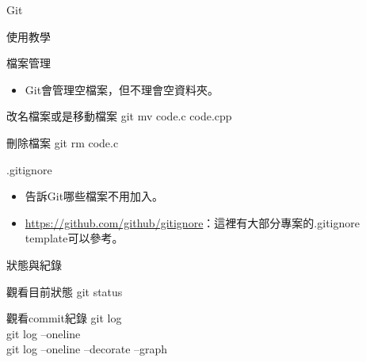 \documentclass[pdf,16pt]{beamer}
\begin{document}
\begin{section}{Git}
\begin{subsection}{使用教學}
      \begin{frame}{檔案管理}
        \begin{itemize}
          \item Git會管理空檔案，但不理會空資料夾。
        \end{itemize}
        \begin{block}{改名檔案或是移動檔案}
          git mv code.c code.cpp
        \end{block}
        \begin{block}{刪除檔案}
          git rm code.c
        \end{block}
      \end{frame}
      
      \begin{frame}{.gitignore}
        \begin{itemize}
          \item 告訴Git哪些檔案不用加入。
          \item \url{https://github.com/github/gitignore}：這裡有大部分專案的.gitignore template可以參考。
        \end{itemize}
      \end{frame}
      
      \begin{frame}{狀態與紀錄}
        \begin{block}{觀看目前狀態}
          git status
        \end{block}
        \begin{block}{觀看commit紀錄}
          git log\\
          git log --oneline\\
          git log --oneline --decorate --graph
        \end{block}
      \end{frame}
    \end{subsection}
   \end{section}
\end{document}
